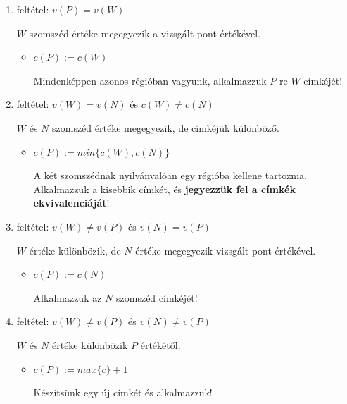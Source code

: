 \begin{enumerate}
  \item feltétel: $v(P) = v(W)$ \\ \begin{small} $W$ szomszéd értéke megegyezik a vizsgált pont értékével. \end{small}   
    \begin{itemize}
      \item $c(P) := c(W)$ \\ \begin{small} Mindenképpen azonos régióban vagyunk, alkalmazzuk $P$-re $W$ címkéjét! \end{small}
    \end{itemize}
 
  \item feltétel: $v(W) = v(N)$ és $c(W) \neq c(N)$ \\ \begin{small}$W$ és $N$ szomszéd értéke megegyezik, de címkéjük különböző. \end{small}
    \begin{itemize}
      \item $c(P) := min \lbrace c(W), c(N)\rbrace$ \\ \begin{small}A két szomszédnak nyilvánvalóan egy régióba kellene tartoznia. Alkalmazzuk a kisebbik címkét, és \textbf{jegyezzük fel a címkék ekvivalenciáját}!\end{small}
    \end{itemize}

  \item feltétel: $v(W) \neq v(P)$ és $v(N) = v(P)$ \\ \begin{small}$W$ értéke különbözik, de $N$ értéke megegyezik vizsgált pont értékével. \end{small}
    \begin{itemize}
      \item $c(P) := c(N)$ \\ \begin{small}Alkalmazzuk az $N$ szomszéd címkéjét!\end{small}
    \end{itemize}

  \item feltétel: $v(W) \neq v(P)$ és $v(N) \neq v(P)$  \\ \begin{small}$W$ és $N$ értéke különbözik $P$ értékétől.\end{small}
    \begin{itemize}
      \item $c(P) := max \lbrace c \rbrace + 1$ \\ \begin{small}Készítsünk egy új címkét és alkalmazzuk!\end{small}
    \end{itemize}

\end{enumerate}


